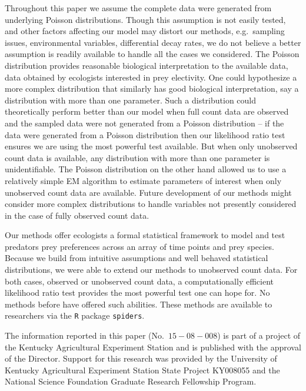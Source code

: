 \documentclass[smallextended]{svjour3}
\begin{document}
Throughout this paper we assume the complete data were generated from underlying Poisson distributions.  Though this assumption is not easily tested, and other factors affecting our model may distort our methods, e.g.\ sampling issues, environmental variables, differential decay rates, we do not believe a better assumption is readily available to handle all the cases we considered.  The Poisson distribution provides reasonable biological interpretation to the available data, data obtained by ecologists interested in prey electivity.  One could hypothesize a more complex distribution that similarly has good biological interpretation, say a distribution with more than one parameter.  Such a distribution could theoretically perform better than our model when full count data are observed and the sampled data were not generated from a Poisson distribution -- if the data were generated from a Poisson distribution then our likelihood ratio test ensures we are using the most powerful test available.  But when only unobserved count data is available, any distribution with more than one parameter is unidentifiable.  The Poisson distribution on the other hand allowed us to use a relatively simple EM algorithm to estimate parameters of interest when only unobserved count data are available.  Future development of our methods might consider more complex distributions to handle variables not presently considered in the case of fully observed count data.

Our methods offer ecologists a formal statistical framework to model and test predators prey preferences across an array of time points and prey species.  Because we build from intuitive assumptions and well behaved statistical distributions, we were able to extend our methods to unobserved count data.  For both cases, observed or unobserved count data, a computationally efficient likelihood ratio test provides the most powerful test one can hope for.  No methods before have offered such abilities.  These methods are available to researchers via the \texttt{R} package \texttt{spiders}.  


\begin{acknowledgements}
The information reported in this paper (No.\ $15-08-008$) is part of a project of the Kentucky Agricultural Experiment Station and is published with the approval of the Director.  Support for this research was provided by the University of Kentucky Agricultural Experiment Station State Project KY008055 and the National Science Foundation Graduate Research Fellowship Program.  
\end{acknowledgements}



\end{document}

